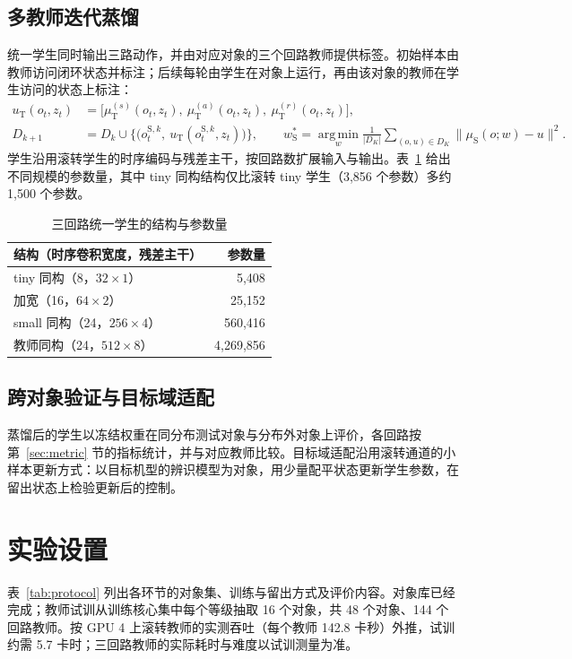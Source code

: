\documentclass[UTF8,a4paper,11pt,fontset=fandol,scheme=plain]{ctexart}
\begin{document}
\subsection{多教师迭代蒸馏}
\label{sec:student}
统一学生同时输出三路动作，并由对应对象的三个回路教师提供标签。初始样本由教师访问闭环状态并标注；后续每轮由学生在对象上运行，再由该对象的教师在学生访问的状态上标注：
\begin{equation}
\begin{aligned}
u_{\mathrm T}(o_t,z_t)&=\bigl[\mu^{(s)}_{\mathrm T}(o_t,z_t),\ \mu^{(a)}_{\mathrm T}(o_t,z_t),\ \mu^{(r)}_{\mathrm T}(o_t,z_t)\bigr],\\
D_{k+1}&=D_k\cup\bigl\{\bigl(o^{\mathrm S,k}_t,\ u_{\mathrm T}(o^{\mathrm S,k}_t,z_t)\bigr)\bigr\},\qquad
w^{*}_{\mathrm S}=\operatorname*{arg\,min}_w\frac{1}{|D_K|}\sum_{(o,u)\in D_K}\|\mu_{\mathrm S}(o;w)-u\|^2 .
\end{aligned}
\end{equation}
学生沿用滚转学生的时序编码与残差主干，按回路数扩展输入与输出。表~\ref{tab:size} 给出不同规模的参数量，其中 tiny 同构结构仅比滚转 tiny 学生（3,856 个参数）多约 1,500 个参数。

\begin{table}[H]
\centering\small
\caption{三回路统一学生的结构与参数量}\label{tab:size}
\begin{tabular}{@{}lr@{}}
\toprule
结构（时序卷积宽度，残差主干） & 参数量 \\
\midrule
tiny 同构（8，\(32\times1\)） & 5,408 \\
加宽（16，\(64\times2\)） & 25,152 \\
small 同构（24，\(256\times4\)） & 560,416 \\
教师同构（24，\(512\times8\)） & 4,269,856 \\
\bottomrule
\end{tabular}
\end{table}

\subsection{跨对象验证与目标域适配}
蒸馏后的学生以冻结权重在同分布测试对象与分布外对象上评价，各回路按第~\ref{sec:metric} 节的指标统计，并与对应教师比较。目标域适配沿用滚转通道的小样本更新方式：以目标机型的辨识模型为对象，用少量配平状态更新学生参数，在留出状态上检验更新后的控制。

\section{实验设置}
\label{sec:setup}
表~\ref{tab:protocol} 列出各环节的对象集、训练与留出方式及评价内容。对象库已经完成；教师试训从训练核心集中每个等级抽取 16 个对象，共 48 个对象、144 个回路教师。按 GPU 4 上滚转教师的实测吞吐（每个教师 142.8 卡秒）外推，试训约需 5.7 卡时；三回路教师的实际耗时与难度以试训测量为准。
\end{document}

